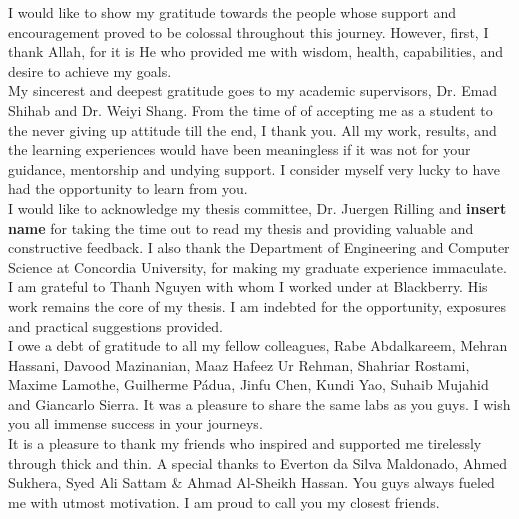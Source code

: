 \documentclass[12pt]{report}
\begin{document}
\begin{acknowledgments}

I would like to show my gratitude towards the people whose support and encouragement proved to be colossal throughout this journey. However, first, I thank Allah, for it is He who provided me with wisdom, health, capabilities, and desire to achieve my goals.
\\

My sincerest and deepest gratitude goes to my academic supervisors, Dr. Emad Shihab and Dr. Weiyi Shang. From the time of of accepting me as a student to the never giving up attitude till the end, I thank you. All my work, results, and the learning experiences would have been meaningless if it was not for your guidance, mentorship and undying support. I consider myself very lucky to have had the opportunity to learn from you.
\\

I would like to acknowledge my thesis committee, Dr. Juergen Rilling and \textbf{insert name} for taking the time out to read my thesis and providing valuable and constructive feedback. I also thank the Department of Engineering and Computer Science at Concordia University, for making my graduate experience immaculate.
\\

I am grateful to Thanh Nguyen with whom I worked under at Blackberry. His work remains the core of my thesis. I am indebted for the opportunity, exposures and practical suggestions provided. 
\\

I owe a debt of gratitude to all my fellow colleagues, 
Rabe Abdalkareem, Mehran Hassani, Davood Mazinanian, Maaz Hafeez Ur Rehman, Shahriar Rostami, Maxime Lamothe, Guilherme Pádua, Jinfu Chen, Kundi Yao, Suhaib Mujahid and Giancarlo Sierra. It was a pleasure to share the same labs as you guys. I wish you all immense success in your journeys. 
\\

It is a pleasure to thank my friends who inspired and supported me tirelessly through thick and thin. A special thanks to Everton da Silva Maldonado, Ahmed Sukhera, Syed Ali Sattam \& Ahmad Al-Sheikh Hassan. You guys always fueled me with utmost motivation. I am proud to call you my closest friends. 
\\





\end{acknowledgments}
\end{document}
